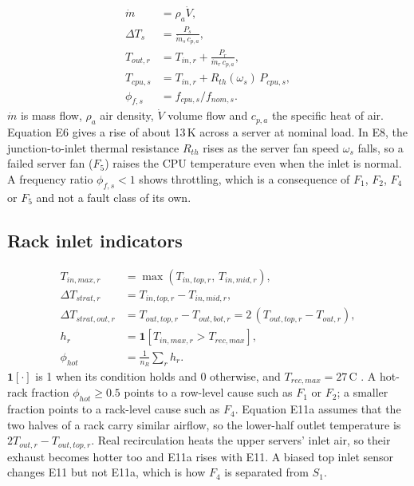 \begin{align}
  \dot m &= \rho_a \dot V , \tag{E5}\\
  \Delta T_s &= \frac{P_s}{\dot m_s\, c_{p,a}} , \tag{E6}\\
  T_{out,r} &= T_{in,r} + \frac{P_r}{\dot m_r\, c_{p,a}} , \tag{E7}\\
  T_{cpu,s} &= T_{in,r} + R_{th}(\omega_s)\, P_{cpu,s} , \tag{E8}\\
  \phi_{f,s} &= f_{cpu,s} / f_{nom,s} . \tag{E9}
\end{align}
$\dot m$ is mass flow, $\rho_a$ air density, $\dot V$ volume flow and $c_{p,a}$ the specific heat of air. Equation E6 gives a rise of about 13\,K across a server at nominal load. In E8, the junction-to-inlet thermal resistance $R_{th}$ rises as the server fan speed $\omega_s$ falls, so a failed server fan ($F_5$) raises the CPU temperature even when the inlet is normal. A frequency ratio $\phi_{f,s} < 1$ shows throttling, which is a consequence of $F_1$, $F_2$, $F_4$ or $F_5$ and not a fault class of its own.

\subsection{Rack inlet indicators}

\begin{align}
  T_{in,max,r} &= \max(T_{in,top,r},\, T_{in,mid,r}) , \tag{E10}\\
  \Delta T_{strat,r} &= T_{in,top,r} - T_{in,mid,r} , \tag{E11}\\
  \Delta T_{strat,out,r} &= T_{out,top,r} - T_{out,bot,r} = 2\,(T_{out,top,r} - T_{out,r}) , \tag{E11a}\label{eq:e11a}\\
  h_r &= \mathbf{1}\!\left[T_{in,max,r} > T_{rec,max}\right] , \tag{E12}\\
  \phi_{hot} &= \frac{1}{n_R} \textstyle\sum_{r} h_r . \tag{E13}
\end{align}
$\mathbf{1}[\cdot]$ is 1 when its condition holds and 0 otherwise, and $T_{rec,max} = 27$\,\textdegree C \parencite{ashrae2021}. A hot-rack fraction $\phi_{hot} \ge 0.5$ points to a row-level cause such as $F_1$ or $F_2$; a smaller fraction points to a rack-level cause such as $F_4$. Equation E11a assumes that the two halves of a rack carry similar airflow, so the lower-half outlet temperature is $2T_{out,r} - T_{out,top,r}$. Real recirculation heats the upper servers' inlet air, so their exhaust becomes hotter too and E11a rises with E11. A biased top inlet sensor changes E11 but not E11a, which is how $F_4$ is separated from $S_1$.

